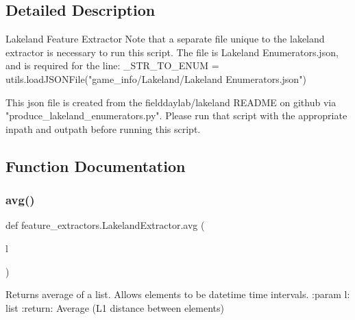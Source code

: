 \subsection{Detailed Description}
\begin{DoxyVerb}Lakeland Feature Extractor
Note that a separate file unique to the lakeland extractor is necessary to run this script.
The file is Lakeland Enumerators.json, and is required for the line:
_STR_TO_ENUM = utils.loadJSONFile("game_info/Lakeland/Lakeland Enumerators.json")

This json file is created from the fielddaylab/lakeland README on github via
"produce_lakeland_enumerators.py". Please run that script with the appropriate inpath and outpath before running this
script.
\end{DoxyVerb}
 

\subsection{Function Documentation}
\mbox{\label{namespacefeature__extractors_1_1_lakeland_extractor_a8fddc453d0515d3be0e46dca69c77a8a}} 
\subsubsection{\texorpdfstring{avg()}{avg()}}
{\footnotesize\ttfamily def feature\+\_\+extractors.\+Lakeland\+Extractor.\+avg (\begin{DoxyParamCaption}\item[{}]{l }\end{DoxyParamCaption})}

\begin{DoxyVerb}Returns average of a list. Allows elements to be datetime time intervals.
:param l: list
:return: Average (L1 distance between elements)
\end{DoxyVerb}
 \mbox{\label{namespacefeature__extractors_1_1_lakeland_extractor_a4d630ffc0f862a66d972e5e4f2a10001}} 
